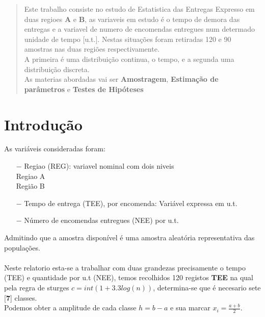 
%

%
\tableofcontents
%
\appendix
%
\pagestyle{plain}%
\newpage
\label{Resumo}
\begin{abstract}
Este trabalho consiste no estudo de Estatistica das Entregas Expresso em  duas regioes \textbf{A} e \textbf{B}, as variaveis em estudo é o tempo de demora das entregas e a variavel de numero de encomendas entregues num determado unidade de tempo [u.t.]. Nestas situações foram retiradas 120 e 90 amostras nas duas regiões respectivamente.\\
A primeira é uma distribuição continua, o tempo, e a segunda uma distribuição discreta.
\\
As materias abordadas vai ser \textbf{Amostragem}, \textbf{Estimação de parâmetros} e \textbf{Testes de Hipóteses}\\
\end{abstract}
%
\newpage
\section{Introdução}\label{Introdução}
%
As variáveis consideradas foram:
\begin{itemize}
\item[$-$] Regiao (REG): variavel nominal com dois niveis\\
\qquad Regiao A \\
\qquad Região B
\item [$-$] Tempo de entrega (TEE), por encomenda: Variável expressa em u.t.
\item [$-$] Número de encomendas entregues (NEE) por u.t.
\end{itemize}
Admitindo que a amostra disponível é uma amostra aleatória representativa das populações.\\
\\
Neste relatorio esta-se a trabalhar com duas  grandezas precisamente o tempo (TEE) e quantidade por u.t (NEE), temos recolhidos 120 registos \textbf{TEE} na qual pela regra de sturges $c = int(1+3.3log(n))$, determina-se que é necesario sete [\textbf{7}] classes. \\
Podemos obter a amplitude de cada classe $h=b-a$ e sua marcar $x_i=\frac{a+b}{2}$. \\
